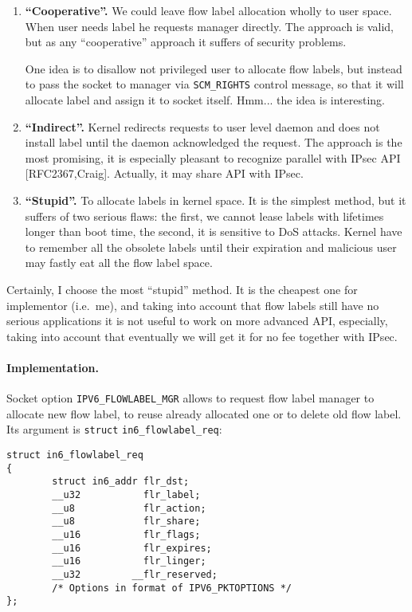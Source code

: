 \begin{enumerate}
\item {\bf ``Cooperative''. } We could leave flow label allocation wholly
to user space. When user needs label he requests manager directly. The approach
is valid, but as any ``cooperative'' approach it suffers of security problems.

\begin{NB}
One idea is to disallow not privileged user to allocate flow
labels, but instead to pass the socket to manager via \verb|SCM_RIGHTS|
control message, so that it will allocate label and assign it to socket
itself. Hmm... the idea is interesting.
\end{NB}

\item {\bf ``Indirect''.} Kernel redirects requests to user level daemon
and does not install label until the daemon acknowledged the request.
The approach is the most promising, it is especially pleasant to recognize
parallel with IPsec API [RFC2367,Craig]. Actually, it may share API with
IPsec.

\item {\bf ``Stupid''.} To allocate labels in kernel space. It is the simplest
method, but it suffers of two serious flaws: the first,
we cannot lease labels with lifetimes longer than boot time, the second, 
it is sensitive to DoS attacks. Kernel have to remember all the obsolete
labels until their expiration and malicious user may fastly eat all the
flow label space.

\end{enumerate}

Certainly, I choose the most ``stupid'' method. It is the cheapest one
for implementor (i.e.\ me), and taking into account that flow labels
still have no serious applications it is not useful to work on more
advanced API, especially, taking into account that eventually we
will get it for no fee together with IPsec.


\paragraph{Implementation.}
Socket option \verb|IPV6_FLOWLABEL_MGR| allows to
request flow label manager to allocate new flow label, to reuse
already allocated one or to delete old flow label.
Its argument is \verb|struct| \verb|in6_flowlabel_req|:

\begin{verbatim}
struct in6_flowlabel_req
{
        struct in6_addr flr_dst;
        __u32           flr_label;
        __u8            flr_action;
        __u8            flr_share;
        __u16           flr_flags;
        __u16           flr_expires;
        __u16           flr_linger;
        __u32         __flr_reserved;
        /* Options in format of IPV6_PKTOPTIONS */
};
\end{verbatim}

